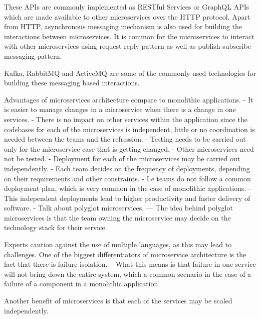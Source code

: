 \documentclass[a4paper, 11pt]{book}
\begin{document}
    These APIs are commonly implemented as RESTful Services or GraphQL APIs which are made available to other microservices over the HTTP protocol.
    Apart from HTTP, asynchronous messaging mechanism is also used for building the interactions between microservices.
    It is common for the microservices to interact with other microservices using request reply pattern as well as publish subscribe messaging pattern.

    Kafka, RabbitMQ and ActiveMQ are some of the commonly used technologies for building these messaging based interactions.

    Advantages of microservices architecture compare to monolithic applications.
    - It is easier to manage changes in a microservice when there is a change in one services.
    - There is no impact on other services within the application since the codebases for each of the microservices is independent, little or no coordination is needed between the teams and the refression.
    - Testing needs to be carried out only for the microservice case that is getting changed.
    - Other microservices need not be tested.
    - Deployment for each of the microservices may be carried out independently.
    - Each team decides on the frequency of deployments, depending on their requirements and other constraints.
    - I.e teams do not follow a common deployment plan, which is very common in the case of monolithic applications.
    - This independent deployments lead to higher productivity and faster delivery of software.
    - Talk about polyglot microservices.
    --- The idea behind polyglot microservices is that the team owning the microservice may decide on the technology stack for their service.

    Experts caution against the use of multiple languages, as this may lead to challenges.
    One of the biggest differentiators of microservice architecture is the fact that there is failure isolation.
    -- What this means is that failure in one service will not bring down the entire system, which a common scenario in the case of a failure of a component in a monolithic application.

    Another benefit of microservices is that each of the services may be scaled independently.
\end{document}
